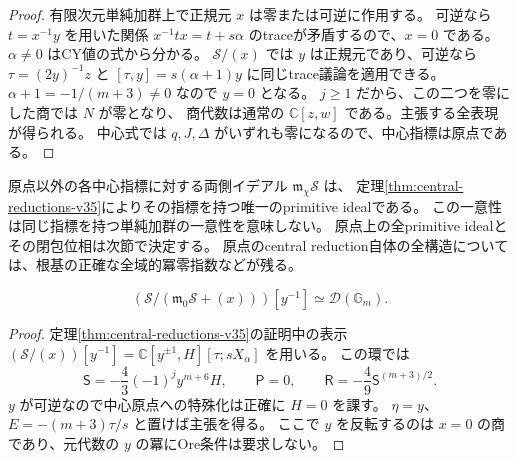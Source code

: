 \begin{proof}
有限次元単純加群上で正規元 $x$ は零または可逆に作用する。
可逆なら $t=x^{-1}y$ を用いた関係
$x^{-1}tx=t+s\alpha$ のtraceが矛盾するので、$x=0$ である。
$\alpha\ne0$ はCY値の式から分かる。
$\mathcal S/(x)$ では $y$ は正規元であり、可逆なら
$\tau=(2y)^{-1}z$ と $[\tau,y]=s(\alpha+1)y$ に同じtrace議論を適用できる。
$\alpha+1=-1/(m+3)\ne0$ なので $y=0$ となる。
$j\ge1$ だから、この二つを零にした商では $N$ が零となり、
商代数は通常の $\mathbb C[z,w]$ である。主張する全表現が得られる。
中心式では $q,J,\Delta$ がいずれも零になるので、中心指標は原点である。
\end{proof}

原点以外の各中心指標に対する両側イデアル $\mathfrak m_\chi\mathcal S$ は、
定理\ref{thm:central-reductions-v35}によりその指標を持つ唯一のprimitive idealである。
この一意性は同じ指標を持つ単純加群の一意性を意味しない。
原点上の全primitive idealとその閉包位相は次節で決定する。
原点のcentral reduction自体の全構造については、根基の正確な全域的冪零指数などが残る。


\begin{lemma}[原点のもう一つの正規局所化]
\label{lem:origin-y-chart-v36}
\[
 \left(\mathcal S/(\mathfrak m_0\mathcal S+(x))\right)[y^{-1}]
 \simeq\mathcal D(\mathbb G_m).
\]
\end{lemma}
\begin{proof}
定理\ref{thm:central-reductions-v35}の証明中の表示
$(\mathcal S/(x))[y^{-1}]=\mathbb C[y^{\pm1},H][\tau;sX_\alpha]$ を用いる。
この環では
\[
 \mathsf S=-\frac43(-1)^j y^{m+6}H,\qquad
 \mathsf P=0,\qquad \mathsf R=-\frac49\mathsf S^{(m+3)/2}.
\]
$y$ が可逆なので中心原点への特殊化は正確に $H=0$ を課す。
$\eta=y$、$E=-(m+3)\tau/s$ と置けば主張を得る。
ここで $y$ を反転するのは $x=0$ の商であり、元代数の $y$ の冪にOre条件は要求しない。
\end{proof}

